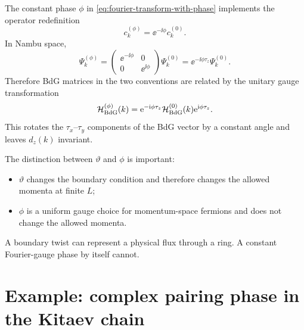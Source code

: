 The constant phase $\phi$ in \cref{eq:fourier-transform-with-phase} implements the
operator redefinition
\begin{equation}
    c_k^{(\phi)}=\ee^{-\ii\phi}c_k^{(0)}.
\end{equation}
In Nambu space,
\begin{equation}
    \Psi_k^{(\phi)}
    =
    \begin{pmatrix}
        \ee^{-\ii\phi} & 0\\
        0 & \ee^{\ii\phi}
    \end{pmatrix}
    \Psi_k^{(0)}
    =
    \ee^{-\ii\phi\tau_z}\Psi_k^{(0)}.
\end{equation}
Therefore BdG matrices in the two conventions are related by the unitary gauge
transformation
\begin{equation}
\label{eq:bdg-gauge-transformation-fourier-phase}
    \mathcal{H}_{\rm BdG}^{(\phi)}(k)
    =
    \mathrm{e}^{-\mathrm{i}\phi\tau_z}
    \mathcal{H}_{\rm BdG}^{(0)}(k)
    \mathrm{e}^{\mathrm{i}\phi\tau_z}.
\end{equation}
This rotates the $\tau_x$--$\tau_y$ components of the BdG vector by a constant
angle and leaves $d_z(k)$ invariant.

The distinction between $\vartheta$ and $\phi$ is important:
\begin{itemize}
    \item $\vartheta$ changes the boundary condition and therefore changes the
    allowed momenta at finite $L$;
    \item $\phi$ is a uniform gauge choice for momentum-space fermions and does
    not change the allowed momenta.
\end{itemize}
A boundary twist can represent a physical flux through a ring.  A constant
Fourier-gauge phase by itself cannot.

\section{Example: complex pairing phase in the Kitaev chain}

